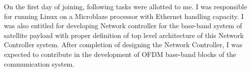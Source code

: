 On the first day of joining, following tasks were allotted to me. I was responsible for running Linux on a Microblaze processor with Ethernet handling capacity. I was also entitled for developing Network controller for the base-band system of satellite payload with proper definition of top level architecture of this Network Controller system. After completion of designing the Network Controller, I was expected to contribute in the development of OFDM base-band blocks of the communication system.
\pagebreak
